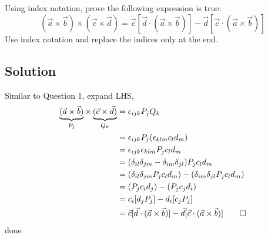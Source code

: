 \section{}
Using index notation, prove the following expression is true:
\begin{equation*}
    (\vec{a} \times \vec{b}) \times (\vec{c} \times \vec{d}) = \vec{c}[ \vec{d} \cdot (\vec{a} \times \vec{b})] - \vec{d}[ \vec{c} \cdot (\vec{a} \times \vec{b})]
\end{equation*}
Use index notation and replace the indices only at the end.

\subsection*{Solution}
Similar to Question 1, expand LHS,
\begin{align*}
    \underbrace{(\vec{a} \times \vec{b})}_{P_j} \times \underbrace{(\vec{c} \times \vec{d})}_{Q_k} &= \epsilon_{ijk} P_j Q_k \\
    &= \epsilon_{ijk} P_j (\epsilon_{klm} c_l d_m) \\
    &= \epsilon_{ijk} \epsilon_{klm} P_j c_l d_m \\
    &= (\delta_{il} \delta_{jm} - \delta_{im} \delta_{jl}) P_j c_l d_m \\
    &= (\delta_{il} \delta_{jm} P_j c_l d_m) - (\delta_{im} \delta_{jl} P_j c_l d_m) \\
    &= (P_j c_i d_j) - (P_j c_j d_i) \\
    &= c_i [d_j P_j] - d_i [c_j P_j] \\
    &= \vec{c} [ \vec{d} \cdot (\vec{a} \times \vec{b})] - \vec{d} [ \vec{c} \cdot (\vec{a} \times \vec{b})] \qed
\end{align*}    
done